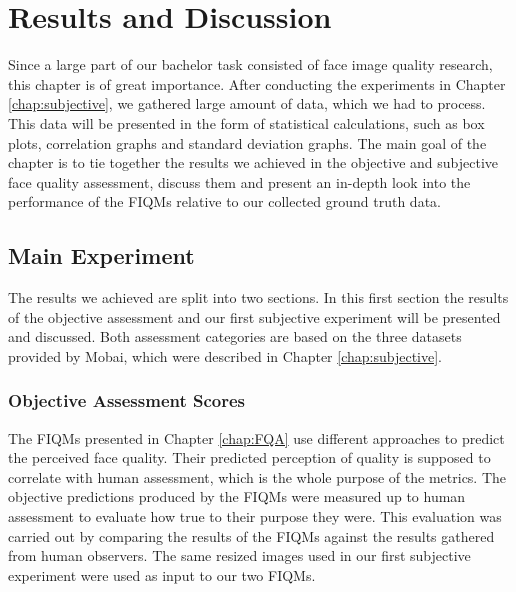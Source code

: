 \chapter{Results and Discussion}
\label{chap:Results}
Since a large part of our bachelor task consisted of face image quality research, this chapter is of great importance. After conducting the experiments in Chapter \ref{chap:subjective}, we gathered large amount of data, which we had to process. This data will be presented in the form of statistical calculations, such as box plots, correlation graphs and standard deviation graphs. The main goal of the chapter is to tie together the results we achieved in the objective and subjective face quality assessment, discuss them and present an in-depth look into the performance of the FIQMs relative to our collected ground truth data.   

\section{Main Experiment}
The results we achieved are split into two sections. In this first section the results of the objective assessment and our first subjective experiment will be presented and discussed. Both assessment categories are based on the three datasets provided by Mobai, which were described in Chapter \ref{chap:subjective}. 

\subsection{Objective Assessment Scores}
The FIQMs presented in Chapter \ref{chap:FQA} use different approaches to predict the perceived face quality. Their predicted perception of quality is supposed to correlate with human assessment, which is the whole purpose of the metrics. The objective predictions produced by the FIQMs were measured up to human assessment to evaluate how true to their purpose they were. This evaluation was carried out by comparing the results of the FIQMs against the results gathered from human observers. The same resized images used in our first subjective experiment were used as input to our two FIQMs. 
\newpage

